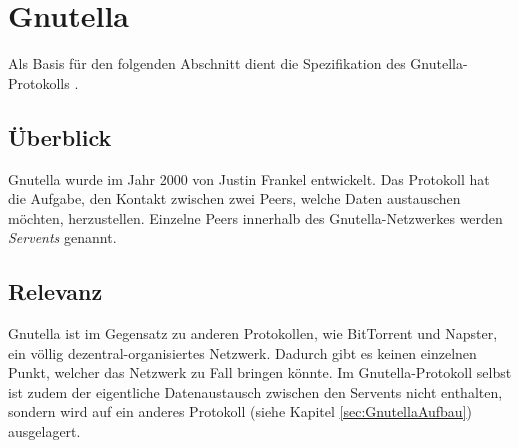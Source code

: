 \section{Gnutella}
Als Basis für den folgenden Abschnitt dient die Spezifikation des Gnutella-Protokolls \parencite{GnutellaProtocol}.

\subsection{Überblick}
Gnutella wurde im Jahr 2000 von Justin Frankel entwickelt.
Das Protokoll hat die Aufgabe, den Kontakt zwischen zwei Peers, welche Daten austauschen möchten, herzustellen. Einzelne Peers innerhalb des Gnutella-Netzwerkes werden \emph{Servents} genannt. 

\subsection{Relevanz}
Gnutella ist im Gegensatz zu anderen Protokollen, wie BitTorrent und Napster, ein völlig dezentral-organisiertes Netzwerk. Dadurch gibt es keinen einzelnen Punkt, welcher das Netzwerk zu Fall bringen könnte. Im Gnutella-Protokoll selbst ist zudem der eigentliche Datenaustausch zwischen den Servents nicht enthalten, sondern wird auf ein anderes Protokoll (siehe Kapitel \ref{sec:GnutellaAufbau}) ausgelagert.

